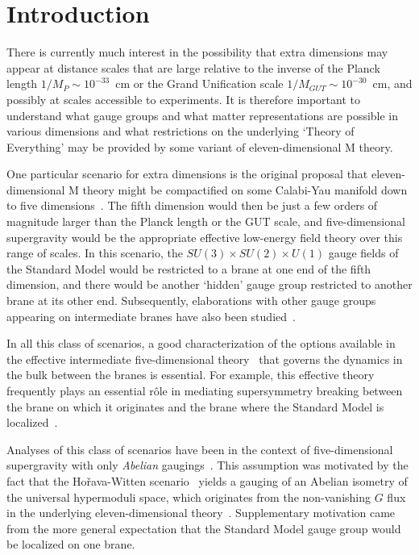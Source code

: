 \documentclass[a4paper,11pt]{article}
\renewcommand{\theequation}{\thesection.\arabic{equation}}
\begin{document}
\begin{titlepage}
\begin{small}
\end{small}




\end{titlepage}

\renewcommand{\theequation}{\arabic{section}.\arabic{equation}}
\section{Introduction}
\setcounter{equation}{0}

There is currently much interest in the possibility that extra dimensions may appear at 
distance scales that are large relative to the inverse of the Planck length $1/M_P \sim 
10^{-33}$~cm or the Grand Unification scale $1/M_{GUT} \sim 10^{-30}$~cm, and possibly 
at scales accessible to experiments. It is therefore important to understand what gauge 
groups and what matter representations are possible in various dimensions and  what 
restrictions on the underlying `Theory of Everything' may be provided by some variant of 
eleven-dimensional M theory.

One particular scenario for extra dimensions is the original proposal that
eleven-dimensional M theory might be compactified on some Calabi-Yau
manifold down to five dimensions~\cite{HW}. The fifth dimension would then
be just a few orders of magnitude larger than the Planck length or the GUT
scale, and five-dimensional supergravity would be the appropriate
effective low-energy field theory over this range of scales. In this
scenario, the $SU(3) \times SU(2) \times U(1)$ gauge fields of the
Standard Model would be restricted to a brane at one end of the fifth
dimension, and there would be another `hidden' gauge group restricted to
another brane at its other end. Subsequently, elaborations with other
gauge groups appearing on intermediate branes have also been
studied~\cite{Ovrut}. 

In all this class of scenarios, a good characterization of the options
available in the effective intermediate five-dimensional
theory~\cite{CY,Gflux} that governs the dynamics in the bulk between the
branes is essential. For example, this effective theory frequently plays
an essential r\^ole in mediating supersymmetry breaking between the brane
on which it originates and the brane where the Standard Model is
localized~\cite{susyX}. 

Analyses of this class of scenarios have been in the context of
five-dimensional supergravity with only {\it Abelian} gaugings~\cite{CY}. 
This assumption was motivated by the fact that the Ho\v{r}ava-Witten
scenario~\cite{HW} yields a gauging of an Abelian isometry of the
universal hypermoduli space, which originates from the non-vanishing $G$
flux in the underlying eleven-dimensional theory~\cite{Gflux,LOSW2}. 
Supplementary motivation came from the more general expectation that the
Standard Model gauge group would be localized on one brane. 
\end{document}
